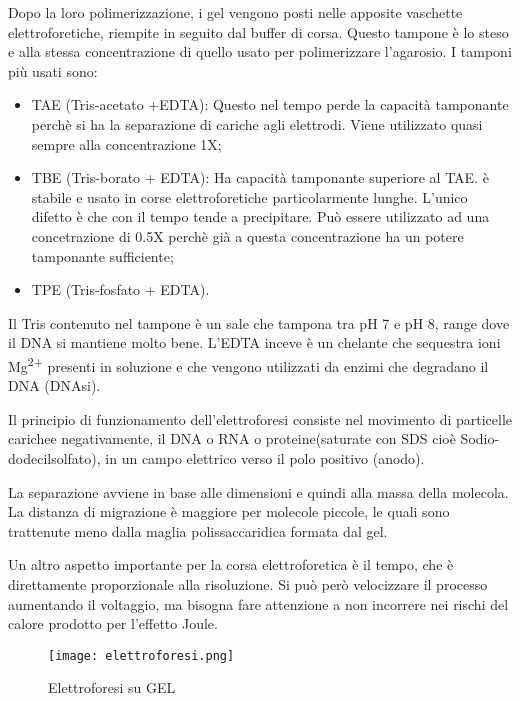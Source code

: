 \documentclass{article}
\begin{document}
Dopo la loro polimerizzazione, i gel vengono posti nelle apposite vaschette elettroforetiche, riempite in seguito dal buffer di corsa. 
Questo tampone è lo steso e alla stessa concentrazione di quello usato per polimerizzare l'agarosio. 
\vspace{0.3cm}
I tamponi più usati sono: 
\begin{itemize}

\item{TAE (Tris-acetato +EDTA): } Questo nel tempo perde la capacità tamponante perchè si ha la separazione di cariche agli elettrodi. Viene utilizzato quasi sempre alla concentrazione 1X; 

\item{TBE (Tris-borato + EDTA):} Ha capacità tamponante superiore al TAE. è stabile e usato in corse elettroforetiche particolarmente lunghe. L'unico difetto è che con il tempo tende a precipitare. Può essere utilizzato ad una concetrazione di 0.5X perchè già a questa concentrazione ha un potere tamponante sufficiente;

\item{TPE (Tris-fosfato + EDTA).}

 \end{itemize}

Il Tris contenuto nel tampone è un sale che tampona tra pH 7 e pH 8, range dove il DNA si mantiene molto bene. L'EDTA inceve è un chelante che sequestra ioni Mg\textsuperscript{2+} presenti in soluzione e che vengono utilizzati da enzimi che degradano il DNA (DNAsi). 

Il principio di funzionamento dell'elettroforesi consiste nel movimento di particelle carichee negativamente, il DNA o RNA o proteine(saturate con SDS cioè Sodio-dodecilsolfato), in un campo elettrico verso il polo positivo (anodo). 

La separazione avviene in base alle dimensioni e quindi alla massa della molecola. La distanza di migrazione è maggiore per molecole piccole, le quali sono trattenute meno dalla maglia polissaccaridica formata dal gel. 

Un altro aspetto importante per la corsa elettroforetica è il tempo, che è direttamente proporzionale alla risoluzione. Si può però velocizzare il processo aumentando il voltaggio, ma bisogna fare attenzione a non incorrere nei rischi del calore prodotto per l'effetto Joule. 

\begin{figure}[H]

\centering
\texttt{[image: elettroforesi.png]}
\caption{Elettroforesi su GEL}
\label{elettroforesi}

\end{figure}
\end{document}
